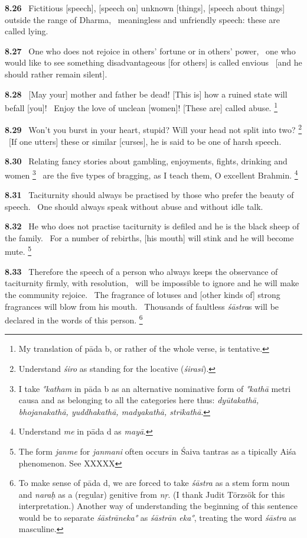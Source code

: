 \documentclass{article}
\newcommand{\skt}[1]{\textit{#1}}
\begin{document}
\textbf{8.26}%
\ Fictitious [speech], [speech on] unknown [things], [speech about things] outside the range of Dharma,%
\ meaningless and unfriendly speech: these are called lying.%


\textbf{8.27}%
\ One who does not rejoice in others' fortune or in others' power,%
\ one who would like to see something disadvantageous [for others] is called envious%
\                 [and he should rather remain silent].%


\textbf{8.28}%
\ [May your] mother and father be dead! [This is] how a ruined state will befall [you]!%
\ Enjoy the love of unclean [women]! [These are] called abuse.%
\footnote{My translation of pāda b, or rather of the whole verse, is tentative. }%


\textbf{8.29}%
\ Won't you burst in your heart, stupid? Will your head not split into two?%
\footnote{Understand \skt{śiro} as standing for the locative (\skt{śirasi}). }%
\ [If one utters] these or similar [curses], he is said to be one of harsh speech.%


\textbf{8.30}%
\ Relating fancy stories about gambling, enjoyments, fights, drinking and women%
\footnote{I take \skt{°katham} in pāda b as an alternative nominative form of \skt{°kathā} metri causa and as                 belonging to all the categories here thus: \skt{dyūtakathā, bhojanakathā, yuddhakathā, madyakathā,                strīkathā}. }%
\ are the five types of bragging, as I teach them, O excellent Brahmin.%
\footnote{Understand \skt{me} in pāda d as \skt{mayā}. }%


\textbf{8.31}%
\ Taciturnity should always be practised by those who prefer the beauty of speech.%
\ One should always speak without abuse and without idle talk.%


\textbf{8.32}%
\ He who does not practise taciturnity is defiled and he is the black sheep of the family.%
\ For a number of rebirths, [his mouth] will stink and he will become mute.%
\footnote{The form \skt{janme} for \skt{janmani} often occurs in Śaiva tantras as a tipically Aiśa phenomenon.                See XXXXX  }%


\textbf{8.33}%
\ Therefore the speech of a person who always keeps the observance of taciturnity firmly, with resolution,%
\ will be impossible to ignore and he will make the community rejoice.%
\ The fragrance of lotuses and [other kinds of] strong fragrances will blow from his mouth.%
\ Thousands of faultless \skt{śāstra}s will be declared in the words of this person.%
\footnote{To make sense of pāda d, we are forced to take \skt{śāstra} as a stem form noun and                 \skt{naraḥ} as a (regular) genitive from \skt{nṛ}. (I thank Judit Törzsök for this interpretation.)                Another way of understanding the beginning of this sentence would be to separate \skt{śāstrāneka°} as                \skt{śāstrān eka°}, treating the word \skt{śāstra} as masculine. }%
\end{document}
